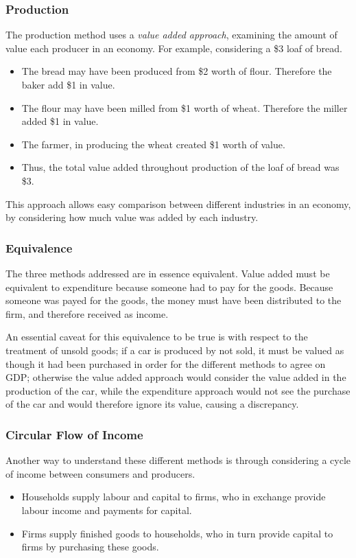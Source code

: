 \documentclass[12pt]{report}
\begin{document}
\begin{flushleft}
\subsubsection*{Production}
The production method uses a \textit{value added approach}, examining the 
amount of value each producer in an economy. For example, considering a \$3 
loaf of bread.
\begin{itemize}
    \item The bread may have been produced from \$2 worth of flour. Therefore
        the baker add \$1 in value.
    \item The flour may have been milled from \$1 worth of wheat. Therefore the
        miller added \$1 in value.
    \item The farmer, in producing the wheat created \$1 worth of value.
    \item Thus, the total value added throughout production of the loaf of 
        bread was \$3.
\end{itemize}
This approach allows easy comparison between different industries in an 
economy, by considering how much value was added by each industry.

\subsubsection*{Equivalence}
The three methods addressed are in essence equivalent. Value added must be
equivalent to expenditure because someone had to pay for the goods. Because 
someone was payed for the goods, the money must have been distributed to the 
firm, and therefore received as income. \par
An essential caveat for this equivalence to be true is with respect to the
treatment of unsold goods; if a car is produced by not sold, it must be valued
as though it had been purchased in order for the different methods to agree on
GDP; otherwise the value added approach would consider the value added in the
production of the car, while the expenditure approach would not see the 
purchase of the car and would therefore ignore its value, causing a 
discrepancy.

\subsubsection*{Circular Flow of Income}
Another way to understand these different methods is through considering a 
cycle of income between consumers and producers.
\begin{itemize}
    \item Households supply labour and capital to firms, who in exchange 
        provide labour income and payments for capital.
    \item Firms supply finished goods to households, who in turn provide
        capital to firms by purchasing these goods.
\end{itemize}


\end{flushleft}
\end{document}
